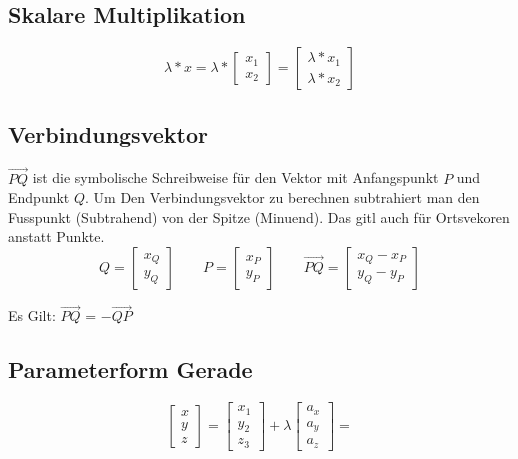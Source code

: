 \documentclass[9pt,a4paper]{article}
\begin{document}
    \subsection{Skalare Multiplikation}
    $$\lambda * x = \lambda * \begin{bmatrix} x_1 \\ x_2 \end{bmatrix} = \begin{bmatrix} \lambda *x_1 \\ \lambda * x_2 \end{bmatrix}$$
    \subsection{Verbindungsvektor}
    $\overrightarrow{PQ}$ ist die symbolische Schreibweise für den Vektor mit Anfangspunkt $P$ und Endpunkt $Q$. Um Den Verbindungsvektor zu berechnen subtrahiert man den Fusspunkt (Subtrahend) von der Spitze (Minuend). Das gitl auch für Ortsvekoren anstatt Punkte.
    \[
    Q = \begin{bmatrix} x_Q \\ y_Q \end{bmatrix}
    \qquad
    P = \begin{bmatrix} x_P \\ y_P \end{bmatrix}
    \qquad
    \overrightarrow{PQ}
    = \begin{bmatrix} x_Q - x_P \\ y_Q - y_P \end{bmatrix}
    \]
    
    Es Gilt: $\overrightarrow{PQ}$ = $-\overrightarrow{QP}$
    
    \subsection{Parameterform Gerade}
    $$ \begin{bmatrix} x \\ y \\ z \end{bmatrix} = \begin{bmatrix} x _1 \\ y_2 \\ z_3 \end{bmatrix} + \lambda\begin{bmatrix} a_x \\ a_y \\ a_z \end{bmatrix} = $$
    
\end{document}
